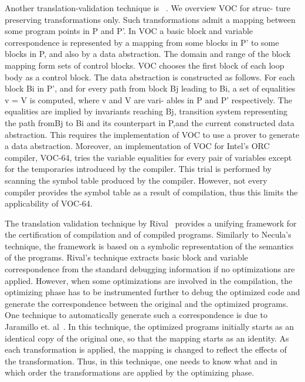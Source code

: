 Another translation-validation technique is ~\cite{VOC2002}. We overview VOC
for struc- ture preserving transformations only. Such transformations admit a
mapping between some program points in P and P'. In VOC a basic block and
variable correspondence is represented by a mapping from some blocks in P' to
some blocks in P, and also by a data abstraction. The domain and range of the
block mapping form sets of control blocks. VOC chooses the first block of each
loop body as a control block. The data abstraction is constructed as follows.
For each block Bi in P', and for every path from block Bj leading to Bi, a set
of equalities v = V is computed, where v and V are vari- ables in P and P'
respectively. The equalities are implied by invariants reaching Bj, transition
system representing the path fromBj to Bi and its counterpart in P,and the
current constructed data abstraction. This requires the implementation of VOC
to use a prover to generate a data abstraction. Moreover, an implementation of
VOC for Intel’s ORC compiler, VOC-64, tries the variable equalities for every
pair of variables except for the temporaries introduced by the compiler. This
trial is performed by scanning the symbol table produced by the compiler.
However, not every compiler provides the symbol table as a result of
compilation, thus this limits the applicability of VOC-64.


The translation validation technique by Rival~\cite{Rival:2004} provides a unifying framework for
the certification of compilation and of compiled programs. Similarly to
Necula’s technique, the framework is based on a symbolic representation of the
semantics of the programs. Rival’s technique extracts basic block and variable
correspondence from the standard debugging information if no optimizations are
applied. However, when some optimizations are involved in the compilation, the
optimizing phase has to be instrumented further to debug the optimized code and
generate the correspondence between the original and the optimized programs.
One technique to automatically generate such a correspondence is due to
Jaramillo et. al~\cite{Jaramillo98}.  In this technique, the optimized programs initially
starts as an identical copy of the original one, so that the mapping starts as
an identity. As each transformation is applied, the mapping is changed to
reflect the effects of the transformation. Thus, in this technique, one needs
to know what and in which order the transformations are applied by the
optimizing phase.  

